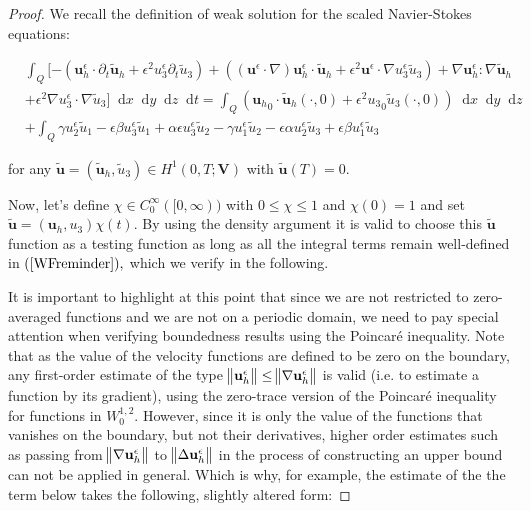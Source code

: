 \documentclass[11pt]{article}
\newcommand*\diff{\mathop{}\!\mathrm{d}}
\begin{document}
\begin{proof}

We recall the definition of weak solution for the scaled Navier-Stokes equations:

\begin{equation} \label{WFreminder}
  \begin{split}
    & \int_Q [ - (\mathbf{u}_h^\epsilon \cdot \partial_t \tilde{\mathbf{u}}_h + \epsilon^2 u_3^\epsilon \partial_t \tilde{u}_3) +( (\mathbf{u}^\epsilon \cdot \nabla) \mathbf{u}_h^\epsilon \cdot \tilde{\mathbf{u}}_h + \epsilon^2 \mathbf{u}^\epsilon \cdot \nabla u_3^\epsilon \tilde{u}_3 ) + \nabla \mathbf{u}_h^\epsilon : \nabla \tilde{\mathbf{u}}_h \\
    & + \epsilon^2 \nabla u_3^\epsilon \cdot \nabla \tilde{u}_3 ] \diff x \diff y \diff z \diff t = \int_Q ({\mathbf{u}_h}_0 \cdot \tilde{\mathbf{u}}_h (\cdot , 0) + \epsilon^2 {u_3}_0 \tilde{u}_3 (\cdot , 0)) \diff x \diff y \diff z \\
    & + \int_Q  \gamma u_2^\epsilon \tilde{u}_1 - \epsilon \beta u_3^\epsilon \tilde{u}_1 + \alpha \epsilon u_3^\epsilon \tilde{u}_2 - \gamma u_1^\epsilon \tilde{u}_2 - \epsilon \alpha u_2^\epsilon \tilde{u}_3 + \epsilon \beta u_1^\epsilon \tilde{u}_3
  \end{split}
\end{equation}

for any $\tilde{\mathbf{u}} = (\tilde{\mathbf{u}}_h, \tilde{u}_3) \in H^1 (0,T;\mathbf{V})$ with $\tilde{\mathbf{u}}(T) = 0.$

Now, let's define $\chi \in C_0^\infty ([0, \infty))$ with $0 \leq \chi \leq 1$ and $\chi (0) = 1$ and set $\tilde{\mathbf{u}} = (\mathbf{u}_h,u_3) \chi (t).$ By using the density argument it is valid to choose this $\tilde{\mathbf{u}}$ function as a testing function as long as all the integral terms remain well-defined in $(\ref{WFreminder}),$ which we verify in the following.

It is important to highlight at this point that since we are not restricted to zero-averaged functions and we are not on a periodic domain, we need to pay special attention when verifying boundedness results using the Poincar\'e inequality. Note that as the value of the velocity functions are defined to be zero on the boundary, any first-order estimate of the type $\norm{\mathbf{u}_h^\epsilon} \leq \norm{\nabla \mathbf{u}_h^\epsilon}$ is valid (i.e. to estimate a function by its gradient), using the zero-trace version of the Poincar\'e inequality for functions in $W^{1,2}_0.$ However, since it is only the value of the functions that vanishes on the boundary, but not their derivatives, higher order estimates such as passing from $\norm{\nabla \mathbf{u}_h^\epsilon}$ to $\norm{\Delta \mathbf{u}_h^\epsilon}$ in the process of constructing an upper bound can not be applied in general. Which is why, for example, the estimate of the the term below takes the following, slightly altered form:


\end{proof}
\end{document}
